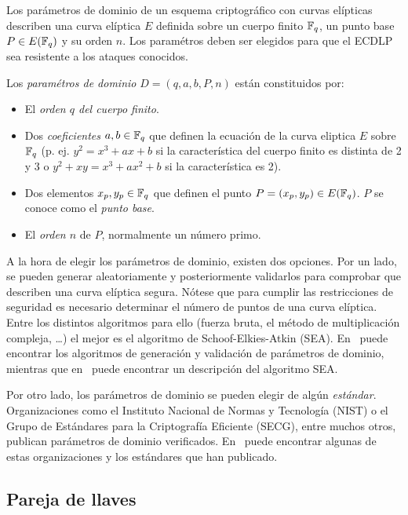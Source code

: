 Los parámetros de dominio de un esquema criptográfico con curvas elípticas describen una curva elíptica $E$ definida sobre un cuerpo finito $\mathbb{F}_q$, un punto base $P \in E(\mathbb{F}_q)$ y su orden $n$. Los paramétros deben ser elegidos para que el ECDLP sea resistente a los ataques conocidos.

\begin{definicion}
    Los \emph{paramétros de dominio} $D = (q, a, b, P, n)$ están constituidos por:
    \begin{itemize}
        \item El \emph{orden $q$ del cuerpo finito}.
        \item Dos \emph{coeficientes} $a, b \in \mathbb{F}_q$ que definen la ecuación de la curva eliptica $E$ sobre $\mathbb{F}_q$ (p. ej. $y^2 = x^3 + a x + b$ si la característica del cuerpo finito es distinta de 2 y 3 o $y^2 + x y = x^3 + a x^2 + b$ si la característica es 2).
        \item Dos elementos $x_p, y_p \in \mathbb{F}_q$ que definen el punto $P = (x_p, y_p) \in E(\mathbb{F}_q)$. $P$ se conoce como el \emph{punto base}.
        \item El \emph{orden $n$} de $P$, normalmente un número primo.
    \end{itemize}
\end{definicion}

A la hora de elegir los parámetros de dominio, existen dos opciones. Por un lado, se pueden generar aleatoriamente y posteriormente validarlos para comprobar que describen una curva elíptica segura. Nótese que para cumplir las restricciones de seguridad es necesario determinar el número de puntos de una curva elíptica. Entre los distintos algoritmos para ello (fuerza bruta, el método de multiplicación compleja, \ldots) el mejor es el algoritmo de Schoof-Elkies-Atkin (SEA). En~\cite[cap. 4]{Hankerson:2003} puede encontrar los algoritmos de generación y validación de parámetros de dominio, mientras que en~\cite[cap. XI]{Silverman:2009} puede encontrar un descripción del algoritmo SEA.

Por otro lado, los parámetros de dominio se pueden elegir de algún \emph{estándar}. Organizaciones como el Instituto Nacional de Normas y Tecnología (NIST) o el Grupo de Estándares para la Criptografía Eficiente (SECG), entre muchos otros, publican
parámetros de dominio verificados. En~\cite[apéndice B]{Hankerson:2003} puede encontrar algunas de estas organizaciones y los estándares que han publicado.

\subsection{Pareja de llaves}
\label{sub:Pareja de llaves}

